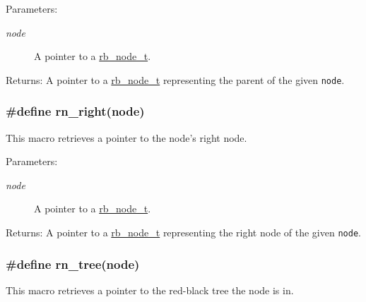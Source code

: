 \begin{Desc}
\item[Parameters:]
\begin{description}
\item[{\em node}]A pointer to a \hyperlink{group__dbprim__rbtree_a1}{rb\_\-node\_\-t}.\end{description}
\end{Desc}
\begin{Desc}
\item[Returns:]A pointer to a \hyperlink{group__dbprim__rbtree_a1}{rb\_\-node\_\-t} representing the parent of the given {\tt node}. \end{Desc}
\hypertarget{group__dbprim__rbtree_a31}{
\subsubsection[rn\_\-right]{\setlength{\rightskip}{0pt plus 5cm}\#define rn\_\-right(node)}}
\label{group__dbprim__rbtree_a31}


This macro retrieves a pointer to the node's right node.

\begin{Desc}
\item[Parameters:]
\begin{description}
\item[{\em node}]A pointer to a \hyperlink{group__dbprim__rbtree_a1}{rb\_\-node\_\-t}.\end{description}
\end{Desc}
\begin{Desc}
\item[Returns:]A pointer to a \hyperlink{group__dbprim__rbtree_a1}{rb\_\-node\_\-t} representing the right node of the given {\tt node}. \end{Desc}
\hypertarget{group__dbprim__rbtree_a28}{
\subsubsection[rn\_\-tree]{\setlength{\rightskip}{0pt plus 5cm}\#define rn\_\-tree(node)}}
\label{group__dbprim__rbtree_a28}


This macro retrieves a pointer to the red-black tree the node is in.


